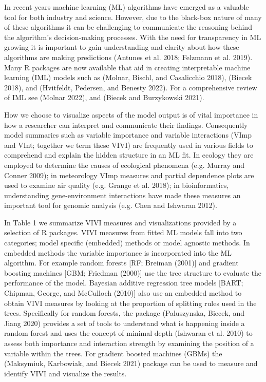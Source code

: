 In recent years machine learning (ML) algorithms have emerged as a
valuable tool for both industry and science. However, due to the
black-box nature of many of these algorithms it can be challenging to
communicate the reasoning behind the algorithm's decision-making
processes. With the need for transparency in ML growing it is important
to gain understanding and clarity about how these algorithms are making
predictions (Antunes et al. 2018; Felzmann et al. 2019). Many R
packages are now available that aid in creating interpretable machine
learning (IML) models such as  (Molnar, Bischl, and Casalicchio 2018),  (Biecek 2018),
 and (Hvitfeldt, Pedersen, and Benesty 2022). For a
comprehensive review of IML see (Molnar 2022), and
(Biecek and Burzykowski 2021).

How we choose to visualize aspects of the model output is of vital
importance in how a researcher can interpret and communicate their
findings. Consequently model summaries such as variable importance and
variable interactions (VImp and VInt; together we term these VIVI) are
frequently used in various fields to comprehend and explain the hidden
structure in an ML fit. In ecology they are employed to determine the
causes of ecological phenomena (e.g. Murray and Conner 2009); in meteorology
VImp measures and partial dependence plots are used to examine air
quality (e.g. Grange et al. 2018); in bioinformatics, understanding
gene-environment interactions have made these measures an important tool
for genomic analysis (e.g. Chen and Ishwaran 2012).

In Table 1 we summarize VIVI measures and visualizations
provided by a selection of R packages. VIVI measures from fitted ML
models fall into two categories; model specific (embedded) methods or
model agnostic methods. In embedded methods the variable importance is
incorporated into the ML algorithm. For example random forests {[}RF;
Breiman (2001){]} and gradient boosting machines {[}GBM;
Friedman (2000){]} use the tree structure to evaluate the performance of the
model. Bayesian additive regression tree models {[}BART; Chipman, George, and McCulloch (2010){]}
also use an embedded method to obtain VIVI measures by looking at the
proportion of splitting rules used in the trees. Specifically for random
forests, the package  (Paluszynska, Biecek, and Jiang 2020) provides
a set of tools to understand what is happening inside a random forest
and uses the concept of minimal depth (Ishwaran et al. 2010) to assess both importance and interaction
strength by examining the position of a variable within the trees. For
gradient boosted machines (GBMs) the  (Maksymiuk, Karbowiak, and Biecek 2021) package can be used to
measure and identify VIVI and visualize the results.

